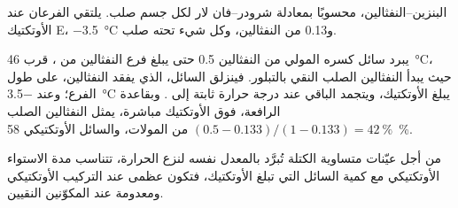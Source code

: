 \begin{omfigure}

{\small البنزين--النفثالين، محسوبًا بمعادلة شرودر--فان لار
لكل جسم صلب. يلتقي الفرعان عند الأوتكتيك E،
\qty{-3.5}{\degreeCelsius} و0.13 من النفثالين، وكل شيء تحته صلب.}
\end{omfigure}

\begin{example}\label{ex:b2:solid-liquid-diagrams:naphthalene}
يبرد سائل كسره المولي من النفثالين 0.5 حتى يبلغ فرع النفثالين
من ، قرب \qty{46}{\degreeCelsius}، حيث يبدأ النفثالين الصلب النقي
بالتبلور. فينزلق السائل، الذي يفقد النفثالين، على طول
الفرع؛ وعند \qty{-3.5}{\degreeCelsius} يبلغ الأوتكتيك، ويتجمد الباقي
عند درجة حرارة ثابتة إلى . وبقاعدة الرافعة،
فوق الأوتكتيك مباشرة، يمثل النفثالين الصلب $(0.5 - 0.133)/(1 - 0.133) =
42~\%$ من المولات، والسائل الأوتكتيكي 58~\%.
\end{example}

\begin{proposition}\label{prop:b2:solid-liquid-diagrams:plateau-length}
من أجل عيّنات متساوية الكتلة تُبرَّد بالمعدل نفسه لنزع الحرارة، تتناسب
مدة الاستواء الأوتكتيكي مع كمية السائل التي
تبلغ الأوتكتيك، فتكون عظمى عند التركيب الأوتكتيكي ومعدومة عند
المكوّنين النقيين.
\end{proposition}

